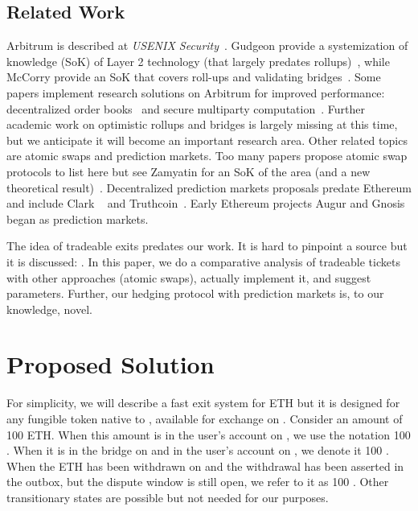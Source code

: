 \subsection{Related Work} 

Arbitrum is described at \textit{USENIX Security}~\cite{kalodner2018arbitrum}. Gudgeon \etal provide a systemization of knowledge (SoK) of Layer 2 technology (that largely predates rollups)~\cite{gudgeon2019sok}, while McCorry \etal provide an SoK that covers roll-ups and validating bridges~\cite{mccorry2021sok}. Some papers implement research solutions on Arbitrum for improved performance:  decentralized order books~\cite{moosavi2021lissy} and secure multiparty computation~\cite{demirag2021absentia}. Further academic work on optimistic rollups and bridges is largely missing at this time, but we anticipate it will become an important research area.  Other related topics are atomic swaps and prediction markets. Too many papers propose atomic swap protocols to list here but see Zamyatin \etal for an SoK of the area (and a new theoretical result)~\cite{zamyatin2021sok}. Decentralized prediction markets proposals predate Ethereum and include Clark \etal~\cite{clark2014decentralizing} and Truthcoin~\cite{sztorc2015truthcoin}. Early Ethereum projects Augur and Gnosis began as prediction markets. 

The idea of tradeable exits predates our work. It is hard to pinpoint a source but it is discussed: . In this paper, we do a comparative analysis of tradeable tickets with other approaches (atomic swaps), actually implement it, and suggest parameters. Further, our hedging protocol with prediction markets is, to our knowledge, novel.


\section{Proposed Solution} 

For simplicity, we will describe a fast exit system for ETH but it is designed for any fungible token native to \layerone, available for exchange on \layerone. Consider an amount of 100 ETH. When this amount is in the user's account on \layerone, we use the notation 100 \ethone. When it is in the bridge on \layerone and in the user's account on \layertwo, we denote it 100 \ethtwo. When the ETH has been withdrawn on \layertwo and the withdrawal has been asserted in the \layerone outbox, but the dispute window is still open, we refer to it as 100 \ethxx. Other transitionary states are possible but not needed for our purposes.

